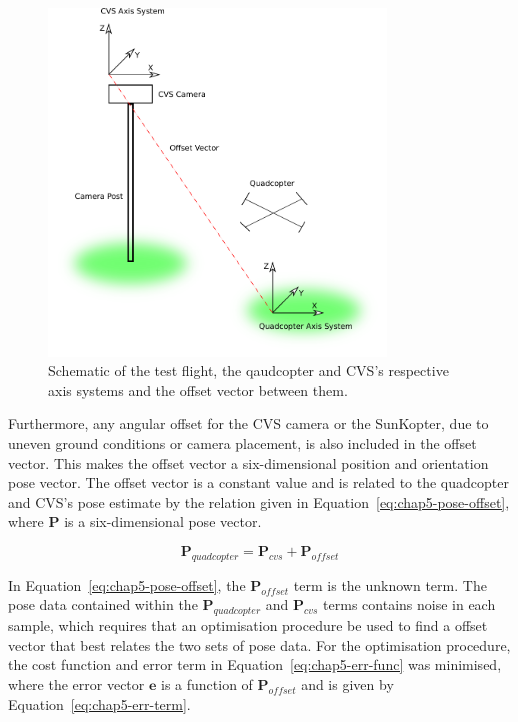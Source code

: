 \begin{figure}
  \centering
  \includegraphics[width=0.8\textwidth]{figures/chapter5/test_flight_schem}
  \caption[Shematic of the test flight layout.]{Schematic of the test flight, the qaudcopter and CVS's respective axis systems and the offset vector between them.}
\label{fig:chap5-flight-test-schem}
\end{figure}

Furthermore, any angular offset for the CVS camera or the SunKopter, due to uneven ground conditions or camera placement, is also included in the offset vector. This makes the offset vector a six-dimensional position and orientation pose vector. The offset vector is a constant value and is related to the quadcopter and CVS's pose estimate by the relation given in Equation~\ref{eq:chap5-pose-offset}, where $\bm{P}$ is a six-dimensional pose vector. 

\begin{equation}
  \label{eq:chap5-pose-offset}
  \bm{P}_{quadcopter} = \bm{P}_{cvs} + \bm{P}_{of\!fset}
\end{equation}

In Equation~\ref{eq:chap5-pose-offset}, the $\bm{P}_{of\!fset}$ term is the unknown term. The pose data contained within the $\bm{P}_{quadcopter}$ and $\bm{P}_{cvs}$ terms contains noise in each sample, which requires that an optimisation procedure be used to find a offset vector that best relates the two sets of pose data. For the optimisation procedure, the cost function and error term in Equation~\ref{eq:chap5-err-func} was minimised, where the error vector $\bm{e}$ is a function of $\bm{P}_{of\!fset}$ and is given by Equation~\ref{eq:chap5-err-term}. 

